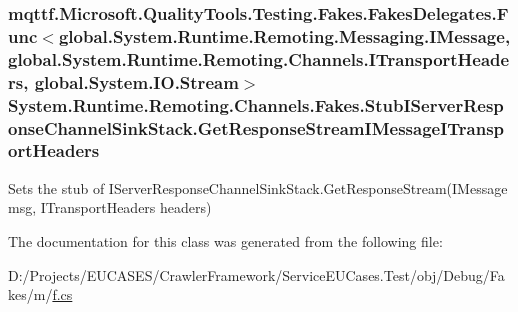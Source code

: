 \hypertarget{class_system_1_1_runtime_1_1_remoting_1_1_channels_1_1_fakes_1_1_stub_i_server_response_channel_sink_stack_a4f26034e5eb5342ef986c1d4ad510957}{
\subsubsection[{Get\-Response\-Stream\-I\-Message\-I\-Transport\-Headers}]{\setlength{\rightskip}{0pt plus 5cm}mqttf.\-Microsoft.\-Quality\-Tools.\-Testing.\-Fakes.\-Fakes\-Delegates.\-Func$<$global.\-System.\-Runtime.\-Remoting.\-Messaging.\-I\-Message, global.\-System.\-Runtime.\-Remoting.\-Channels.\-I\-Transport\-Headers, global.\-System.\-I\-O.\-Stream$>$ System.\-Runtime.\-Remoting.\-Channels.\-Fakes.\-Stub\-I\-Server\-Response\-Channel\-Sink\-Stack.\-Get\-Response\-Stream\-I\-Message\-I\-Transport\-Headers}}\label{class_system_1_1_runtime_1_1_remoting_1_1_channels_1_1_fakes_1_1_stub_i_server_response_channel_sink_stack_a4f26034e5eb5342ef986c1d4ad510957}


Sets the stub of I\-Server\-Response\-Channel\-Sink\-Stack.\-Get\-Response\-Stream(\-I\-Message msg, I\-Transport\-Headers headers)



The documentation for this class was generated from the following file\-:\begin{DoxyCompactItemize}
\item 
D\-:/\-Projects/\-E\-U\-C\-A\-S\-E\-S/\-Crawler\-Framework/\-Service\-E\-U\-Cases.\-Test/obj/\-Debug/\-Fakes/m/\hyperlink{m_2f_8cs}{f.\-cs}\end{DoxyCompactItemize}
